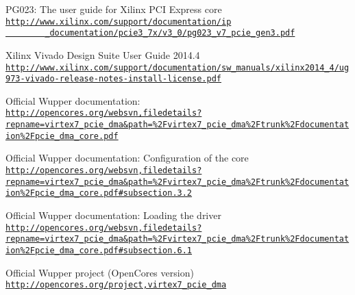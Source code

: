 \begin{thebibliography}{9}

	PG023: The user guide for Xilinx PCI Express core\\
	\href{http://www.xilinx.com/support/documentation/ip_documentation/pcie3_7x/v3_0/pg023_v7_pcie_gen3.pdf}{\nolinkurl{http://www.xilinx.com/support/documentation/ip
		\_documentation/pcie3\_7x/v3\_0/pg023\_v7\_pcie\_gen3.pdf}}


	Xilinx Vivado Design Suite User Guide 2014.4\\
	\href{http://www.xilinx.com/support/documentation/sw_manuals/xilinx2014_4/ug973-vivado-release-notes-install-license.pdf}{\nolinkurl{http://www.xilinx.com/support/documentation/sw\_manuals/xilinx2014\_4/ug973-vivado-release-notes-install-license.pdf}}
	
	Official Wupper documentation: \\
	\href{http://opencores.org/websvn,filedetails?repname=virtex7_pcie_dma&path=\%2Fvirtex7_pcie_dma\%2Ftrunk\%2Fdocumentation\%2Fpcie_dma_core.pdf}{\nolinkurl{http://opencores.org/websvn,filedetails?repname=virtex7\_pcie\_dma&path=\%2Fvirtex7\_pcie\_dma\%2Ftrunk\%2Fdocumentation\%2Fpcie\_dma\_core.pdf}}
	
	Official Wupper documentation: Configuration of the core \\
	\href{http://opencores.org/websvn,filedetails?repname=virtex7_pcie_dma&path=\%2Fvirtex7_pcie_dma\%2Ftrunk\%2Fdocumentation\%2Fpcie_dma_core.pdf#subsection.3.2}
	{\nolinkurl{http://opencores.org/websvn,filedetails?repname=virtex7\_pcie\_dma&path=\%2Fvirtex7\_pcie\_dma\%2Ftrunk\%2Fdocumentation\%2Fpcie\_dma\_core.pdf\#subsection.3.2}}	

	Official Wupper documentation: Loading the driver \\
	\href{http://opencores.org/websvn,filedetails?repname=virtex7_pcie_dma&path\%2Fvirtex7_pcie_dma\%2Ftrunk\%2Fdocumentation\%2Fpcie_dma_core.pdf#subsection.6.1}{\nolinkurl{http://opencores.org/websvn,filedetails?repname=virtex7\_pcie\_dma&path=\%2Fvirtex7\_pcie\_dma\%2Ftrunk\%2Fdocumentation\%2Fpcie\_dma\_core.pdf\#subsection.6.1}}
	


	
	Official Wupper project (OpenCores version)\\
    \href{http://opencores.org/project,virtex7_pcie_dma}{\nolinkurl{http://opencores.org/project,virtex7\_pcie\_dma}}
	

\end{thebibliography}
